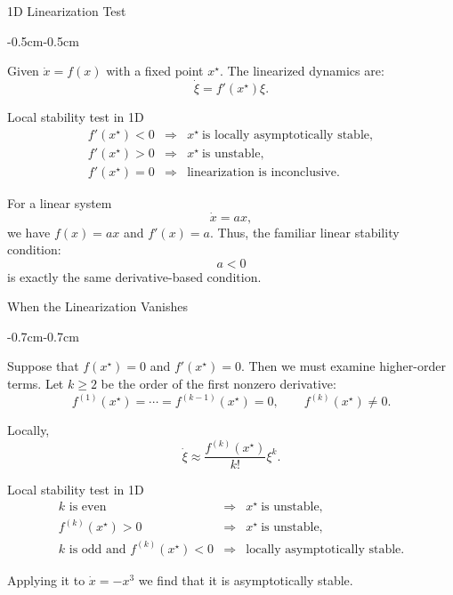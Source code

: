 \documentclass{beamer}
\begin{document}
\begin{frame}{1D Linearization Test}
	\begin{flushleft}
		\begin{adjustwidth}{-0.5cm}{-0.5cm}
	
	Given $\dot{x}=f(x)$ with a fixed point \(x^\star\). The linearized dynamics are:
	\[
	\dot{\xi}=f'(x^\star)\xi.
	\]
	
	\begin{block}{Local stability test in 1D}
		\[
			\begin{array}{rcl}
				f'(x^\star)<0
				&\Longrightarrow&
				x^\star\ \text{is locally asymptotically stable},\\[0.2cm]
				f'(x^\star)>0
				&\Longrightarrow&
				x^\star\ \text{is unstable},\\[0.2cm]
				f'(x^\star)=0
				&\Longrightarrow&
				\text{linearization is inconclusive.}
			\end{array}
		\]
	\end{block}
	
	
	For a linear system
	\[
	\dot{x}=ax,
	\]
	we have $f(x)=ax$ and $f'(x)=a$. Thus, the familiar linear stability condition:
	\[
	a<0
	\]
	is exactly the same derivative-based condition.
	
	\end{adjustwidth}
\end{flushleft}
\end{frame}




\begin{frame}{When the Linearization Vanishes}
	\begin{flushleft}
		\begin{adjustwidth}{-0.7cm}{-0.7cm}
	
	Suppose that $f(x^\star)=0$ and $f'(x^\star)=0$. Then we must examine higher-order terms. Let \(k\geq 2\) be the order of the first nonzero derivative:
	\[
	f^{(1)}(x^\star)=\cdots=f^{(k-1)}(x^\star)=0,
	\qquad
	f^{(k)}(x^\star)\neq 0.
	\]
	
	Locally,
	\[
	\dot{\xi}
	\approx
	\frac{f^{(k)}(x^\star)}{k!}\xi^k.
	\]
	

\begin{block}{Local stability test in 1D}
	\vspace{-0.9em}
	\[\begin{array}{rcl}
		k \text{ is even}
		&\Longrightarrow&
		x^\star\ \text{is unstable},\\[0.2cm]
		f^{(k)}(x^\star)>0
		&\Longrightarrow&
		x^\star\ \text{is unstable},\\[0.2cm]
		k \text{ is odd and } f^{(k)}(x^\star)< 0 
		&\Longrightarrow&
		\text{locally asymptotically stable.}
	\end{array}
	\]
\end{block}
	
	Applying it to $\dot{x}=-x^3$ we find that it is asymptotically stable.
	
	\end{adjustwidth}
\end{flushleft}
\end{frame}
\end{document}
